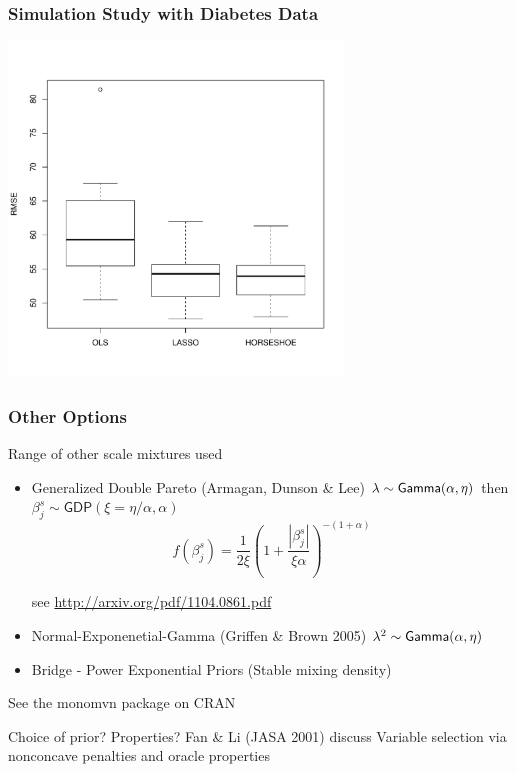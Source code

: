 \documentclass[handout]{beamer}
\begin{document}
\begin{frame}
  \frametitle{Simulation Study with Diabetes Data}
  \includegraphics[height=3.5in]{diabetes}
 
  
\end{frame}

\begin{frame}
  \frametitle{Other Options}
  Range of other scale mixtures used  \pause
  \begin{itemize}
  \item Generalized Double Pareto (Armagan, Dunson \& Lee)  \pause
$\lambda \sim \textsf{Gamma}(\alpha, \eta)$  then $\beta^s_j \sim \textsf{GDP}(\xi
= \eta/\alpha, \alpha)$  \pause
$$
f(\beta^s_j) = \frac{1}{2 \xi} (1 + \frac{|\beta^s_j|}{\xi \alpha})^{-(1 + \alpha)}
$$

see \url{http://arxiv.org/pdf/1104.0861.pdf} \pause
  \item Normal-Exponenetial-Gamma (Griffen \& Brown 2005)
$\lambda^2 \sim \textsf{Gamma}(\alpha, \eta)$ 
  \pause
  \item Bridge - Power Exponential Priors  (Stable mixing density) \pause

   \end{itemize}
See the monomvn package on CRAN \pause

\vfill

Choice of prior?   Properties?  Fan \& Li (JASA 2001) discuss Variable
selection via nonconcave penalties and oracle properties
\end{frame}
\end{document}
